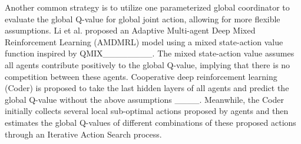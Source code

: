 Another common strategy is to utilize one parameterized global coordinator to evaluate the global Q-value for global joint action, allowing for more flexible assumptions.
Li et al. proposed an Adaptive Multi-agent Deep Mixed Reinforcement Learning (AMDMRL) model using a mixed state-action value function inspired by QMIX________. The mixed state-action value assumes all agents contribute positively to the global Q-value, implying that there is no competition between these agents.
Cooperative deep reinforcement learning (Coder) is proposed to take the last hidden layers of all agents and predict the global Q-value without the above assumptions ____. Meanwhile, the Coder initially collects several local sub-optimal actions proposed by agents and then estimates the global Q-values of different combinations of these proposed actions through an Iterative Action Search process.